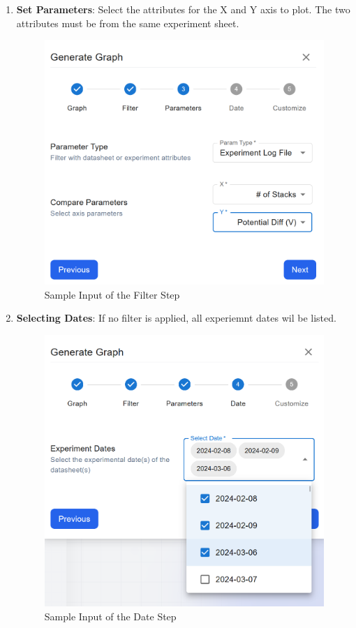 \documentclass[12pt]{article}
\begin{document}
\begin{enumerate}
    \item \textbf{Set Parameters}: \newline
    Select the attributes for the X and Y axis to plot. The two attributes must
    be from the same experiment sheet. 
    \begin{figure}[H]
        \centering
        \includegraphics[scale=0.4]{./Diagrams/graph-param.png}
        \caption{Sample Input of the Filter Step}
        \label{fig:example}
    \end{figure}

    \item \textbf{Selecting Dates}: \newline
    If no filter is applied, all experiemnt dates wil be listed. 
    \begin{figure}[H]
        \centering
        \includegraphics[scale=0.4]{./Diagrams/graph-dates.png}
        \caption{Sample Input of the Date Step}
        \label{fig:example}
    \end{figure}
    

\end{enumerate}
\end{document}
